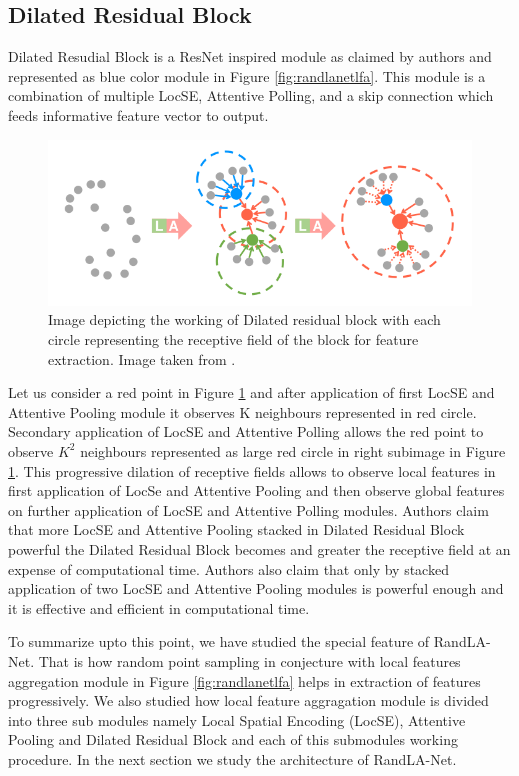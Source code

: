 \subsection{Dilated Residual Block}
Dilated Resudial Block is a ResNet inspired module as claimed by authors and represented as blue color module in Figure \ref{fig:randlanetlfa}.
This module is a combination of multiple LocSE, Attentive Polling, and a skip connection which feeds informative feature vector to output.
\begin{figure}
    \centering
    \includegraphics[scale=0.5]{images/dilatedresidualblock.png}
    \caption{Image depicting the working of Dilated residual block with each circle representing the receptive field of the block for feature extraction. Image taken from \cite{Hu_2020_CVPR_Randla}.}
    \label{fig:dilatedresidualblock}
\end{figure}
Let us consider a red point in Figure \ref{fig:dilatedresidualblock} and after application of first LocSE and Attentive Pooling module it observes K neighbours represented in red circle.
Secondary application of LocSE and Attentive Polling allows the red point to observe $K^{2}$ neighbours represented as large red circle in right subimage in Figure \ref{fig:dilatedresidualblock}.
This progressive dilation of receptive fields allows to observe local features in first application of LocSe and Attentive Pooling and then observe global features on further application of LocSE and Attentive Polling modules.
Authors claim that more LocSE and Attentive Pooling stacked in Dilated Residual Block powerful the Dilated Residual Block becomes and greater the receptive field at an expense of computational time.
Authors also claim that only by stacked application of two LocSE and Attentive Pooling modules is powerful enough and it is effective and efficient in computational time.

To summarize upto this point, we have studied the special feature of RandLA-Net. That is how random point sampling in conjecture with local features aggregation module in Figure \ref{fig:randlanetlfa} helps in extraction of features progressively.
We also studied how local feature aggragation module is divided into three sub modules namely Local Spatial Encoding (LocSE), Attentive Pooling and Dilated Residual Block and each of this submodules working procedure.
In the next section we study the architecture of RandLA-Net.

